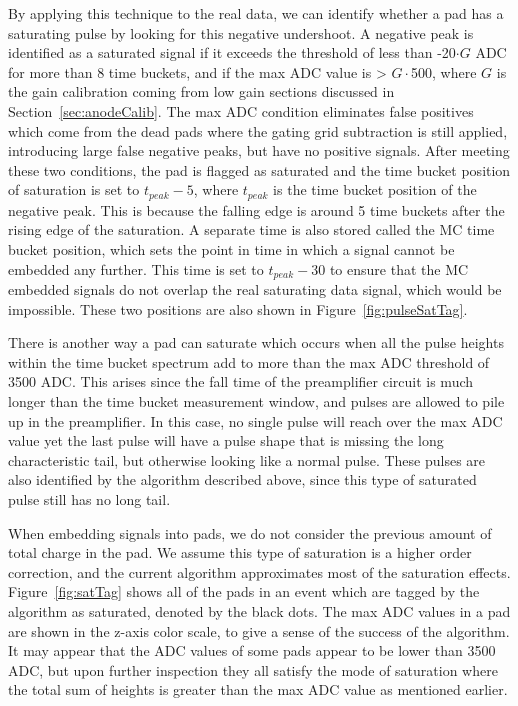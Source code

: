 By applying this technique to the real data, we can identify whether a pad has a saturating pulse by looking for this negative undershoot. A negative peak is identified as a saturated signal if it exceeds the threshold of less than -20$\cdot G$ ADC for more than 8 time buckets, and if the max ADC value is > $G\cdot$500, where $G$ is the gain calibration coming from low gain sections discussed in Section~\ref{sec:anodeCalib}. The max ADC condition eliminates false positives which come from  the dead pads where the gating grid subtraction is still applied, introducing large false negative peaks, but have no positive signals. After meeting these two conditions, the pad is flagged as saturated and the time bucket position of saturation is set to $t_{peak} - 5$, where $t_{peak}$ is the time bucket position of the negative peak. This is because the falling edge is around 5 time buckets after the rising edge of the saturation. A separate time is also stored called the MC time bucket position, which sets the point in time in which a signal cannot be embedded any further. This time is set to $t_{peak} - 30$ to ensure that the MC embedded signals do not overlap the real saturating data signal, which would be impossible. These two positions are also shown in Figure~\ref{fig:pulseSatTag}.

There is another way a pad can saturate which occurs when all the pulse heights within the time bucket spectrum add to more than the max ADC threshold of 3500 ADC. This arises since the fall time of the preamplifier circuit is much longer than the time bucket measurement window, and pulses are allowed to pile up in the preamplifier. In this case, no single pulse will reach over the max ADC value yet the last pulse will have a pulse shape that is missing the long characteristic tail, but otherwise looking like a normal pulse. These pulses are also identified by the algorithm described above, since this type of saturated pulse  still has no long tail. 

 When embedding signals into pads, we do not consider the previous amount of total charge in the pad. We assume this type of saturation is a higher order correction, and the current algorithm approximates most of the saturation effects.  Figure~\ref{fig:satTag} shows all of the pads in an event which are tagged by the algorithm as saturated, denoted by the black dots. The max ADC values in a pad are shown in the z-axis color scale, to give a sense of the success of the algorithm. It may appear that the ADC values of some pads appear to be lower than 3500 ADC, but upon further inspection they all satisfy the mode of saturation where the total sum of heights is greater than the max ADC value as mentioned earlier. 

